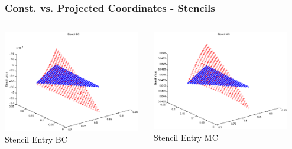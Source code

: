\documentclass[t,compress=false,usepdftitle=false]{beamer}
\begin{document}
\begin{frame}\frametitle{Const. vs. Projected Coordinates - Stencils}

\begin{columns}[T] 
\begin{column}[T]{4.1cm} 
  \centering
  \includegraphics[width=0.98\textwidth]{stencilBC_nE}\\
  Stencil Entry BC
\end{column}\hfill
\begin{column}[T]{4.1cm} 
  \centering
  \includegraphics[width=0.98\textwidth]{stencilMC_nE}\\
  Stencil Entry MC
\end{column}\hfill
\begin{column}[T]{4.1cm} 
  \centering

\end{column}
\end{columns}
\end{frame}
\end{document}
